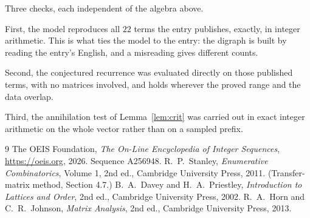 \documentclass[11pt,a4paper]{article}
\theoremstyle{plain}
\theoremstyle{definition}
\begin{document}
Three checks, each independent of the algebra above.

First, the model reproduces all $22$ terms the entry publishes, exactly, in integer
arithmetic. This is what ties the model to the entry: the digraph is built by reading the
entry's English, and a misreading gives different counts.

Second, the conjectured recurrence was evaluated directly on those published terms, with no
matrices involved, and holds wherever the proved range and the data overlap.

Third, the annihilation test of Lemma~\ref{lem:crit} was carried out in exact integer
arithmetic on the whole vector rather than on a sampled prefix.

\begin{thebibliography}{9}
 The OEIS Foundation, \emph{The On-Line Encyclopedia of Integer
Sequences}, \url{https://oeis.org}, 2026. Sequence A256948.
 R.~P.~Stanley, \emph{Enumerative Combinatorics}, Volume 1, 2nd ed.,
Cambridge University Press, 2011. (Transfer-matrix method, Section 4.7.)
 B.~A.~Davey and H.~A.~Priestley, \emph{Introduction to Lattices and
Order}, 2nd ed., Cambridge University Press, 2002.
 R.~A.~Horn and C.~R.~Johnson, \emph{Matrix Analysis}, 2nd ed., Cambridge
University Press, 2013.
\end{thebibliography}
\end{document}
